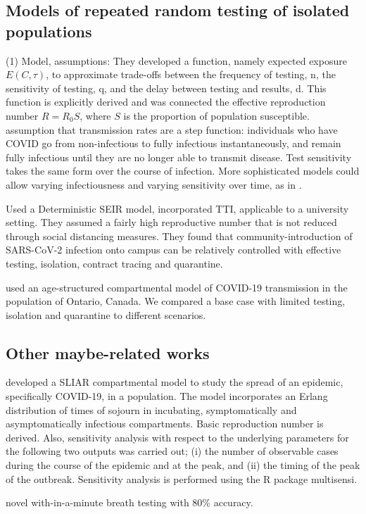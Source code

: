 \documentclass{article}
\theoremstyle{definition} %
\begin{document}
\subsection{Models of repeated random testing of isolated populations}
\cite{bergstrom2020frequency}
(1) Model, assumptions: They developed a function, namely expected exposure $E(C,\tau)$, to approximate trade-offs between the frequency of testing, n, the sensitivity of testing, q, and the delay between
testing and results, d. This function is explicitly derived and was connected the effective reproduction number $R=R_0 S$, where $S$ is the proportion of population susceptible.
assumption that transmission rates are a step function: individuals who
have COVID go from non-infectious to fully infectious instantaneously,
and remain fully infectious until they are no longer able to transmit disease. Test sensitivity takes the same form over the course of infection.
More sophisticated models could allow varying infectiousness and varying
sensitivity over time, as in 
\citep{larremore2020test}.

\citep{lopman2020model} Used a Deterministic SEIR model, incorporated TTI, applicable to a university setting. They assumed a fairly high reproductive number that is not reduced through social
distancing measures. They found that community-introduction of SARS-CoV-2 infection onto campus can be
relatively controlled with effective testing, isolation, contract tracing and quarantine.

\citep{tuite2020mathematical} used an age-structured compartmental model of COVID-19 transmission in the population of Ontario, Canada. We compared a base case with limited testing, isolation and quarantine to different scenarios. 
\subsection{Other maybe-related works}
\citep{arino2020simple} developed a SLIAR compartmental model to study the spread of an epidemic, specifically COVID-19, in a population. The model incorporates an Erlang distribution of times of sojourn in incubating, symptomatically and asymptomatically infectious compartments. Basic reproduction number is derived. Also, sensitivity analysis with respect to the underlying parameters for the following two outputs was carried out; (i) the number of observable cases during the course of the epidemic and at the peak, and (ii) the timing of the peak of the outbreak. Sensitivity analysis is performed using the R package multisensi.

\citep{ruszkiewicz2020diagnosis} novel with-in-a-minute breath testing with 80\% accuracy. 
\end{document}

